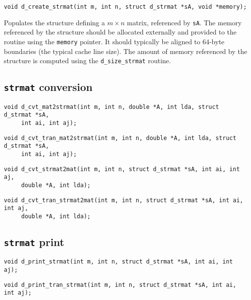 \documentclass[a4paper]{report}
\begin{document}
\begin{verbatim}
void d_create_strmat(int m, int n, struct d_strmat *sA, void *memory);
\end{verbatim}
Populates the structure defining a $m\times n$ matrix, referenced by {\tt sA}.
The memory referenced by the structure should be allocated externally and provided to the routine using the {\tt memory} pointer.
It should typically be aligned to 64-byte boundaries (the typical cache line size).
The amount of memory referenced by the structure is computed using the {\tt d\_size\_strmat} routine.



\subsection{{\tt strmat} conversion}

\begin{verbatim}
void d_cvt_mat2strmat(int m, int n, double *A, int lda, struct d_strmat *sA, 
     int ai, int aj);
\end{verbatim}

\begin{verbatim}
void d_cvt_tran_mat2strmat(int m, int n, double *A, int lda, struct d_strmat *sA, 
     int ai, int aj);
\end{verbatim}

\begin{verbatim}
void d_cvt_strmat2mat(int m, int n, struct d_strmat *sA, int ai, int aj, 
     double *A, int lda);
\end{verbatim}

\begin{verbatim}
void d_cvt_tran_strmat2mat(int m, int n, struct d_strmat *sA, int ai, int aj, 
     double *A, int lda);
\end{verbatim}



\subsection{{\tt strmat} print}

\begin{verbatim}
void d_print_strmat(int m, int n, struct d_strmat *sA, int ai, int aj);
\end{verbatim}

\begin{verbatim}
void d_print_tran_strmat(int m, int n, struct d_strmat *sA, int ai, int aj);
\end{verbatim}
\end{document}

